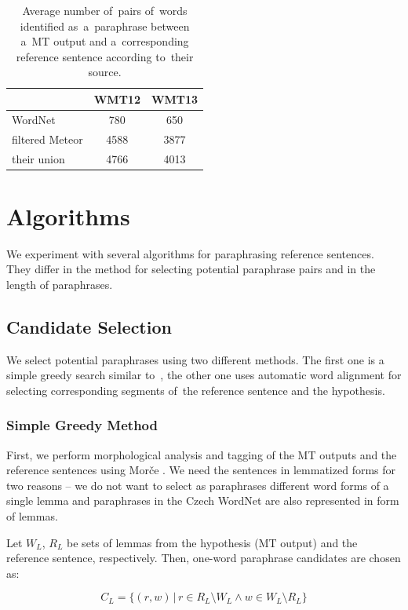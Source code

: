 \begin{table}[t]
\begin{center}
\begin{tabular}{l|cc}
& WMT12 & WMT13 \\
\hline
WordNet            &  780 & 650 \\
filtered Meteor    & 4588 & 3877 \\
their union        & 4766 & 4013 \\
\end{tabular}
\caption{Average number of~pairs of~words identified as~a~paraphrase between 
a~MT output and a~corresponding reference sentence according to~their source.}
\label{number_of_substitutions}
\end{center}
\end{table}

\section{Algorithms}
\label{algorithm}
We experiment with several algorithms for paraphrasing reference sentences. 
They differ in the method for selecting potential paraphrase pairs and in the 
length of paraphrases.

\subsection{Candidate Selection}
We select potential paraphrases using two different methods. The first one is a 
simple greedy search similar to~\citet{kauchak}, the other one uses automatic word
alignment for selecting corresponding segments of~the reference sentence and the 
hypothesis.

\subsubsection{Simple Greedy Method}
First, we perform morphological analysis and tagging of the MT outputs and the 
reference sentences using Morče \cite{morce:2007}. We need the sentences in
lemmatized forms for two reasons -- we do not want to select as paraphrases 
different word forms of a single lemma and paraphrases in the Czech WordNet 
are also represented in form of lemmas.

Let $ W_{L} $, $ R_{L} $ be sets of lemmas
from the hypothesis (MT output) and the reference sentence, respectively. Then, one-word
paraphrase candidates are chosen as:

\begin{equation*}
C_{L} = \{(r,w) \, | \, r \in R_{L} \setminus W_{L} \wedge w \in W_{L} \setminus R_{L} \} 
\end{equation*}

